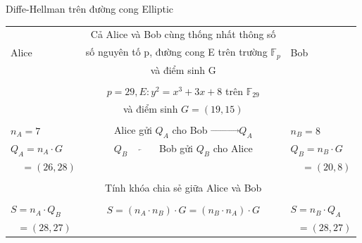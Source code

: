 \documentclass[compress]{beamer}
\begin{document}
\begin{frame}{Diffe-Hellman trên đường cong Elliptic}
\begin{flushleft}
\footnotesize{
\begin{tabular}{lcl}
      &  Cả Alice và Bob cùng thống nhất thông số &   \\
Alice &  số nguyên tố p, đường cong E trên trường $\mathbb{F}_p$ & Bob \\
      &  và điểm sinh G                                          &  \\
\hline \\
      &   $p = 29, E: y^2 = x^3 + 3x + 8$ trên $\mathbb{F}_{29}$ &  \\
      &  và điểm sinh $G = (19, 15)$ & \\
\hline \\ 
$n_A = 7$ &  Alice gửi $Q_A$ cho Bob $\overrightarrow{ \ \ \ \ \ \ \ \ \ \  \ \ \ } Q_A$    &$n_B = 8$  \\
$Q_A = n_A\cdot G$ & $Q_B \overleftarrow{ \ \ \ \ \ \ \ \ \ \  \ \ \ }$ Bob gửi $Q_B$ cho Alice                        &$Q_B = n_B\cdot G$ \\
$\ \ \ \ \ = (26, 28) $ &                           &$\ \ \ \ \ = (20, 8)$ \\
\hline \\
      & Tính khóa chia sẻ giữa Alice và Bob & \\
\hline \\
$S = n_A\cdot Q_B$ &  $S = (n_A\cdot n_B)\cdot G = (n_B\cdot n_A)\cdot G$ & $S = n_B\cdot Q_A$ \\
$\ \ \ = (28, 27)$ &                    &$\ \ \ = (28, 27)$
\end{tabular}
}
\end{flushleft}
\end{frame}
\end{document}
